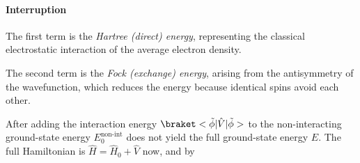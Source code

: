 \begin{solution}
\begin{enumext}
    \paragraph{Interruption}
    \begin{enumext}
      \item The first term is the \emph{Hartree (direct) energy}, representing
      the classical electrostatic interaction of the average electron density.
      \begin{center}
        \begin{minipage}{.45\linewidth}
          \centering
        \end{minipage}
        \hfill
        \begin{minipage}{.45\linewidth}
          \centering
        \end{minipage}
      \end{center}
      \item The second term is the \emph{Fock (exchange) energy}, arising from
      the antisymmetry of the wavefunction, which reduces the energy because
      identical spins avoid each other.
    \end{enumext}
    \item After adding the interaction energy
    $\braket<\tilde\phi|\hat V|\tilde\phi>$ to the non-interacting ground-state
    energy $E_0^{\text{non-int}}$ does not yield the full ground-state
    energy $E$. The full Hamiltonian is $\hat H = \hat H_0 + \hat V$ now, and by

\end{enumext}
\end{solution}
